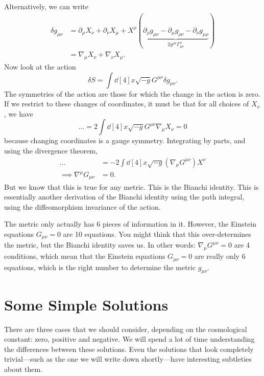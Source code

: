 Alternatively, we can write 
\begin{align}
  \delta g_{\mu\nu} &= \partial_{\mu} X_{\nu} + \partial_{\nu} X_{\mu} + X^{\rho}(\underbrace{\partial_{\rho} g_{\mu\nu} - \partial_{\mu} g_{\rho\nu} - \partial_{\nu} g_{\mu\rho}}_{2 g^{\rho\sigma} \Gamma^{\sigma}_{\mu\nu}}) \\
		    &= \nabla_{\mu} X_{\nu} + \nabla_{\nu} X_{\mu}.
\end{align}
Now look at the action
\begin{equation}
  \delta S = \int \dd[4]{x} \sqrt{-g} G^{\mu\nu} \delta g_{\mu\nu}.
\end{equation}
The symmetries of the action are those for which the change in the action is zero.
If we restrict to these changes of coordinates, it must be that for all choices of $X_{\nu}$, we have
\begin{equation}
  \dots = 2 \int \dd[4]{x} \sqrt{-g} G^{\mu\nu} \nabla_{\mu} X_{\nu} = 0
\end{equation}
because changing coordinates is a gauge symmetry.
Integrating by parts, and using the divergence theorem,
\begin{align}
  \dots &= -2 \int \dd[4]{x} \sqrt{-g} (\nabla_{\mu} G^{\mu\nu}) X^{\nu} \\
  \implies \nabla^{\mu} G_{\mu\nu} &= 0.
\end{align}
But we know that this is true for any metric. This is the Bianchi identity.
This is essentially another derivation of the Bianchi identity using the path integral, using the diffeomorphism invariance of the action.
\begin{leftbar}
  \begin{remark}
    The metric only actually has 6 pieces of information in it. However, the Einstein equations $G_{\mu\nu} = 0$ are 10 equations. You might think that this over-determines the metric, but the Bianchi identity saves us.
    In other words: $\nabla_{\mu} G^{\mu\nu} = 0$ are 4 conditions, which mean that the Einstein equations $G_{\mu\nu} = 0$ are really only 6 equations, which is the right number to determine the metric $g_{\mu\nu}$.
  \end{remark}
\end{leftbar}

\section{Some Simple Solutions}%
\label{sec:some_simple_solutions}

There are three cases that we should consider, depending on the cosmological constant: zero, positive and negative.
We will spend a lot of time understanding the differences between these solutions. Even the solutions that look completely trivial---such as the one we will write down shortly---have interesting subtleties about them.

